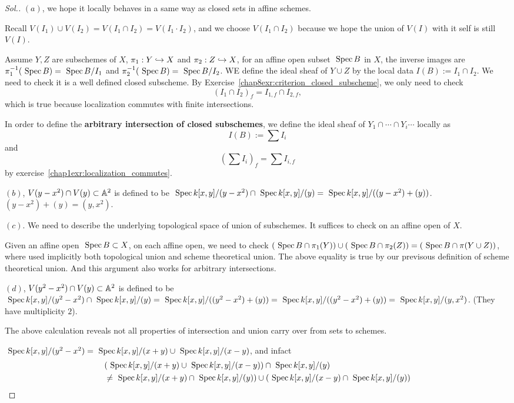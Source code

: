 \documentclass[11pt]{book} %
\begin{document}
\begin{proof}[Sol.]
$(a)$, we hope it locally behaves in a same way as closed sets in affine schemes.

Recall $V(I_1)\cup V(I_2)=V(I_1\cap I_2)=V(I_1\cdot I_2)$, and we choose $V(I_1\cap I_2)$ because we hope the union of $V(I)$ with it self is still $V(I)$.

Assume $Y,Z$ are subschemes of $X$, $\pi_1:Y\hookrightarrow X$ and $\pi_2:Z\hookrightarrow X$, for an affine open subset $\text{ Spec\,} B$ in $X$, the inverse images are $\pi_1^{-1}(\text{ Spec\,} B)=\text{ Spec\,} B/I_1$ and $\pi_2^{-1}(\text{ Spec\,} B)=\text{ Spec\,} B/I_2$. WE define the ideal sheaf of $Y\cup Z$ by the local data $I(B):=I_1\cap I_2$. We need to check it is a well defined closed subscheme. By Exercise~\ref{chap8exr:criterion_closed_subscheme}, we only need to check
$$
(I_1\cap I_2)_f=I_{1,f}\cap I_{2,f},
$$
which is true because localization commutes with finite intersections.

In order to define the \textbf{arbitrary intersection of closed subschemes}, we define the ideal sheaf of $Y_1\cap\cdots\cap Y_i\cdots $ locally as 
$$
I(B):=\sum I_i
$$
and 
$$
(\sum I_i)_f=\sum I_{i,f}
$$
by exercise~\ref{chap1exr:localization_commutes}.

$(b)$, $V(y-x^2)\cap V(y)\subset \mathbb A^2$ is defined to be $\text{ Spec\,} k[x,y]/(y-x^2)\cap \text{ Spec\,} k[x,y]/(y)=\text{ Spec\,} k[x,y]/((y-x^2)+(y))$.
$(y-x^2)+(y)=(y,x^2)$.

$(c)$. We need to describe the underlying topological space of union of subschemes. It suffices to check on an affine open of $X$.

Given an affine open $\text{ Spec\,} B\subset X$, on each affine open, we need to check $(\text{ Spec\,} B\cap \pi_1(Y))\cup (\text{ Spec\,} B\cap \pi_2(Z))=(\text{ Spec\,} B\cap \pi(Y\cup Z))$, where used implicitly both topological union and scheme theoretical union. The above equality is true by our previsous definition of scheme theoretical union. And this argument also works for arbitrary intersections.

$(d)$, $V(y^2-x^2)\cap V(y)\subset \mathbb A^2$ is defined to be $\text{ Spec\,} k[x,y]/(y^2-x^2)\cap \text{ Spec\,} k[x,y]/(y)=\text{ Spec\,} k[x,y]/((y^2-x^2)+(y))=\text{ Spec\,} k[x,y]/((y^2-x^2)+(y))=\text{ Spec\,} k[x,y]/(y,x^2)$. (They have multiplicity $2$).

The above calculation reveals  not all properties of intersection and union carry over from sets to schemes.

$\text{ Spec\,} k[x,y]/(y^2-x^2)=\text{ Spec\,} k[x,y]/(x+y)\cup \text{ Spec\,} k[x,y]/(x-y)$, and infact
$$
\begin{aligned}
&(\text{ Spec\,} k[x,y]/(x+y)\cup \text{ Spec\,} k[x,y]/(x-y))\cap \text{ Spec\,} k[x,y]/(y)\\
&\neq \text{ Spec\,} k[x,y]/(x+y)\cap \text{ Spec\,} k[x,y]/(y))\cup (\text{ Spec\,} k[x,y]/(x-y)\cap \text{ Spec\,} k[x,y]/(y))
\end{aligned}
$$
\end{proof}
\end{document}
